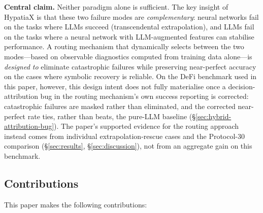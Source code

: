 \documentclass[twoside,11pt]{article}
\begin{document}
\medskip\noindent
\textbf{Central claim.}
Neither paradigm alone is sufficient.  The key insight of HypatiaX is that
these two failure modes are \emph{complementary}: neural networks fail on
the tasks where LLMs succeed (transcendental extrapolation), and LLMs fail
on the tasks where a neural network with LLM-augmented features can stabilise
performance.  A routing mechanism that dynamically selects between the two
modes---based on observable diagnostics computed from training data alone---is
\emph{designed to} eliminate catastrophic failures while preserving near-perfect
accuracy on the cases where symbolic recovery is reliable. On the DeFi
benchmark used in this paper, however, this design intent does not fully
materialise once a decision-attribution bug in the routing mechanism's own
success reporting is corrected: catastrophic failures are masked rather than
eliminated, and the corrected near-perfect rate ties, rather than beats, the
pure-LLM baseline (\S\ref{sec:hybrid-attribution-bug}). The paper's supported
evidence for the routing approach instead comes from individual
extrapolation-rescue cases and the Protocol-30 comparison
(\S\ref{sec:results}, \S\ref{sec:discussion}), not from an aggregate gain on
this benchmark.

\subsection{Contributions}\label{subsec:contributions}
\label{sec:contributions}

This paper makes the following contributions:
\end{document}
